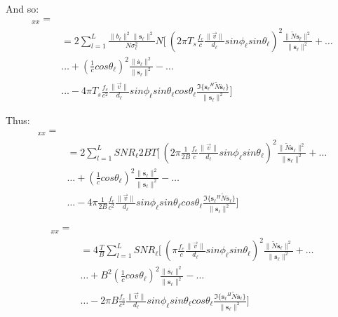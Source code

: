 And so:
\begin{eqnarray}
[J]_{x x} = \\
&= 2\sum_{l=1}^{L}\frac{\|b_\ell \|^2\|\mathbf{s_\ell }\|^2}{N \sigma_\ell ^2} N [\ \left(2 \pi T_s \frac{f_c}{c}\frac{\|\vec{v}\|}{d_\ell }sin\phi_\ell  sin\theta_\ell  \right)^2 \frac{\|\tilde{N}\mathbf{s_\ell }\|^2}{\|\mathbf{s_\ell }\|^2}+ \dots \nonumber \\
&\dots+ \left( \frac{1}{c} cos\theta_\ell  \right)^2 \frac{\|\mathbf{\dot{s_\ell }}\|^2}{\|\mathbf{s_\ell }\|^2} - \dots \nonumber \\
&\dots - 4 \pi T_s \frac{f_c}{c^2}\frac{\|\vec{v}\|}{d_\ell }sin\phi_\ell  sin\theta_\ell  cos \theta_\ell  \frac{\Im\{\mathbf{s_\ell }^H\tilde{N}\mathbf{\dot{s_\ell }}\}}{\|\mathbf{s_\ell }\|^2} ] \nonumber
\end{eqnarray}

Thus:
\begin{eqnarray}
[J]_{x x} = \\
&= 2\sum_{l=1}^{L}{SNR}_\ell 2BT [\ \left(2 \pi \frac{1}{2B} \frac{f_c}{c}\frac{\|\vec{v}\|}{d_\ell }sin\phi_\ell  sin\theta_\ell  \right)^2 \frac{\|\tilde{N}\mathbf{s_\ell }\|^2}{\|\mathbf{s_\ell }\|^2}+ \dots \nonumber \\
&\dots+ \left( \frac{1}{c} cos\theta_\ell  \right)^2 \frac{\|\mathbf{\dot{s_\ell }}\|^2}{\|\mathbf{s_\ell }\|^2} - \dots \nonumber \\
&\dots - 4 \pi \frac{1}{2B} \frac{f_c}{c^2}\frac{\|\vec{v}\|}{d_\ell }sin\phi_\ell  sin\theta_\ell  cos \theta_\ell  \frac{\Im\{\mathbf{s_\ell }^H\tilde{N}\mathbf{\dot{s_\ell }}\}}{\|\mathbf{s_\ell }\|^2} ] \nonumber
\end{eqnarray}

\begin{eqnarray}
[J]_{x x} = \\
&= 4\frac{T}{B} \sum_{l=1}^{L}{SNR}_\ell  [\ \left( \pi \frac{f_c}{c}\frac{\|\vec{v}\|}{d_\ell }sin\phi_\ell  sin\theta_\ell  \right)^2 \frac{\|\tilde{N}\mathbf{s_\ell }\|^2}{\|\mathbf{s_\ell }\|^2}+ \dots \nonumber \\
&\dots+ B^2\left( \frac{1}{c} cos\theta_\ell  \right)^2 \frac{\|\mathbf{\dot{s_\ell }}\|^2}{\|\mathbf{s_\ell }\|^2} - \dots \nonumber \\
&\dots - 2 \pi B \frac{f_c}{c^2}\frac{\|\vec{v}\|}{d_\ell }sin\phi_\ell  sin\theta_\ell  cos \theta_\ell  \frac{\Im\{\mathbf{s_\ell }^H\tilde{N}\mathbf{\dot{s_\ell }}\}}{\|\mathbf{s_\ell }\|^2} ] \nonumber
\end{eqnarray}

